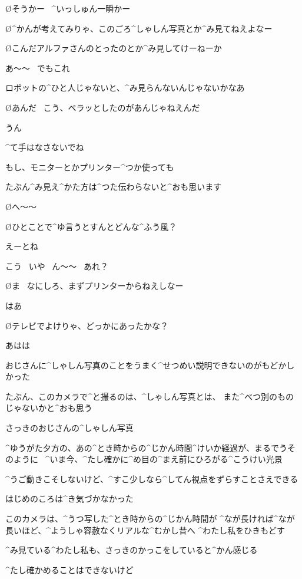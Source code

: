 \O そうかー
\ ^{いっしゅん}{一瞬}かー

\page
\O ^{かんが}{考}えてみりゃ、このごろ^{しゃしん}{写真}とか^{み}{見}てねえよなー

\O こんだアルファさんのとったのとか^{み}{見}してけーねーか

\A あ〜〜
\ でもこれ

\A ロボットの^{ひと}{人}じゃないと、^{み}{見}らんないんじゃないかなあ

\O あんだ
\ こう、ペラッとしたのがあんじゃねえんだ

\A うん

\A ^{て}{手}はなさないでね

\A もし、モニターとかプリンター^{つか}{使}っても

\A たぶん^{み}{見}え^{かた}{方}は^{つた}{伝}わらないと^{おも}{思}います

\O へ〜〜

\page
\O ひとことで^{ゆ}{言}うとすんとどんな^{ふう}{風}？

\A えーとね

\A こう
\ いや
\ ん〜〜
\ あれ？

\O ま
\ なにしろ、まずプリンターからねえしなー

\A はあ

\O テレビでよけりゃ、どっかにあったかな？

\A あはは

\page[138]
\A おじさんに^{しゃしん}{写真}のことをうまく^{せつめい}{説明}できないのがもどかしかった

\A たぶん、このカメラで^{と}{撮}るのは、^{しゃしん}{写真}とは、
また^{べつ}{別}のものじゃないかと^{おも}{思}う

\page
\A さっきのおじさんの^{しゃしん}{写真}

\page
\A ^{ゆうがた}{夕方}の、あの^{とき}{時}からの^{じかん}{時間}^{けいか}{経過}が、まるでうそのように
\ ^{いま}{今}、^{たし}{確}かに^{め}{目}の^{まえ}{前}にひろがる^{こうけい}{光景}

\A ^{うご}{動}きこそしないけど、^{すこ}{少}しなら^{してん}{視点}をずらすことさえできる

\page
\A はじめのころは^{き}{気}づかなかった

\A このカメラは、^{うつ}{写}した^{とき}{時}からの^{じかん}{時間}が
^{なが}{長}ければ^{なが}{長}いほど、^{ようしゃ}{容赦}なくリアルな^{むかし}{昔}へ
^{わたし}{私}をひきもどす

\A ^{み}{見}ている^{わたし}{私}も、さっきのかっこをしていると^{かん}{感}じる

\A ^{たし}{確}かめることはできないけど

